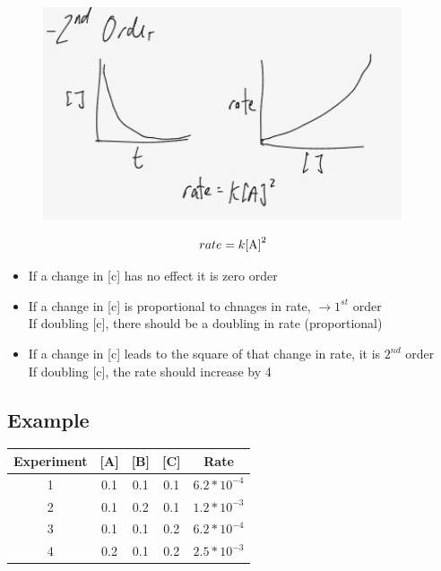 \documentclass{article}
\begin{document}
\begin{figure}[H]
\centering
\includegraphics[width=300pt]{2.3fig3.jpg}
\end{figure}

$$rate = k\ce{[A]}^2$$



\begin{itemize}
\item If a change in [c] has no effect it is zero order
\item If a change in [c] is proportional to chnages in rate,  $\rightarrow 1^{st}$ order\\If doubling [c], there should be a doubling in rate (proportional)
\item If a change in [c] leads to the square of that change in rate, it is $2^{nd}$ order\\If doubling [c], the rate should increase by 4
\end{itemize}


\pagebreak
\subsection{Example}

\begin{center}
\begin{tabular}{|c|c|c|c|c|}
\hline
Experiment & [A] & [B] & [C] & Rate \\
\hline \hline
1 & 0.1 & 0.1 & 0.1 & $6.2*10^{-4}$\\
\hline
2 & 0.1 & 0.2 & 0.1 & $1.2*10^{-3}$\\
\hline
3 & 0.1 & 0.1 & 0.2 & $6.2*10^{-4}$\\
\hline
4 & 0.2 & 0.1 & 0.2 & $2.5*10^{-3}$\\
\hline
\end{tabular}
\end{center}
\end{document}
